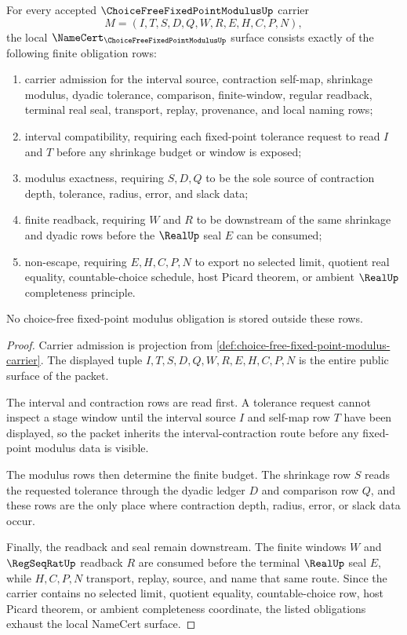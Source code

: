 \begin{theorem}
\label{thm:choice-free-fixed-point-modulus-namecert-obligations}
For every accepted $\ChoiceFreeFixedPointModulusUp$ carrier
$$
M=(I,T,S,D,Q,W,R,E,H,C,P,N),
$$
the local $\NameCert_{\ChoiceFreeFixedPointModulusUp}$ surface consists exactly of the following finite obligation rows:
\begin{enumerate}
\item carrier admission for the interval source, contraction self-map, shrinkage modulus, dyadic tolerance, comparison, finite-window, regular readback, terminal real seal, transport, replay, provenance, and local naming rows;
\item interval compatibility, requiring each fixed-point tolerance request to read $I$ and $T$ before any shrinkage budget or window is exposed;
\item modulus exactness, requiring $S,D,Q$ to be the sole source of contraction depth, tolerance, radius, error, and slack data;
\item finite readback, requiring $W$ and $R$ to be downstream of the same shrinkage and dyadic rows before the $\RealUp$ seal $E$ can be consumed;
\item non-escape, requiring $E,H,C,P,N$ to export no selected limit, quotient real equality, countable-choice schedule, host Picard theorem, or ambient $\RealUp$ completeness principle.
\end{enumerate}
No choice-free fixed-point modulus obligation is stored outside these rows.
\end{theorem}
\begin{proof}
Carrier admission is projection from \autoref{def:choice-free-fixed-point-modulus-carrier}. The displayed tuple $I,T,S,D,Q,W,R,E,H,C,P,N$ is the entire public surface of the packet.

The interval and contraction rows are read first. A tolerance request cannot inspect a stage window until the interval source $I$ and self-map row $T$ have been displayed, so the packet inherits the interval-contraction route before any fixed-point modulus data is visible.

The modulus rows then determine the finite budget. The shrinkage row $S$ reads the requested tolerance through the dyadic ledger $D$ and comparison row $Q$, and these rows are the only place where contraction depth, radius, error, or slack data occur.

Finally, the readback and seal remain downstream. The finite windows $W$ and $\RegSeqRatUp$ readback $R$ are consumed before the terminal $\RealUp$ seal $E$, while $H,C,P,N$ transport, replay, source, and name that same route. Since the carrier contains no selected limit, quotient equality, countable-choice row, host Picard theorem, or ambient completeness coordinate, the listed obligations exhaust the local NameCert surface.
\end{proof}

